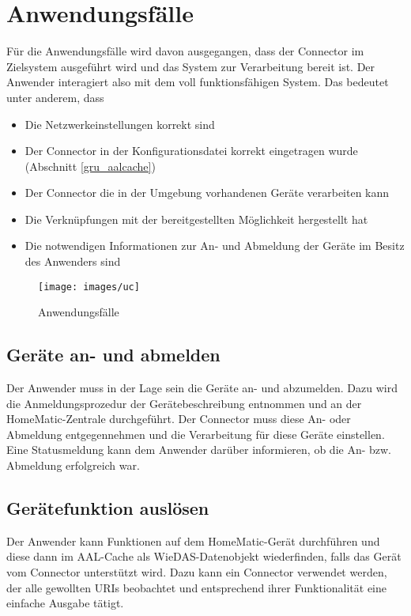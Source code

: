 \section{Anwendungsfälle}
\label{ana_uc}

Für die Anwendungsfälle wird davon ausgegangen, dass der Connector im Zielsystem ausgeführt wird
und das System zur Verarbeitung bereit ist.
Der Anwender interagiert also mit dem voll funktionsfähigen System.
Das bedeutet unter anderem, dass
\begin{itemize}
\item Die Netzwerkeinstellungen korrekt sind
\item Der Connector in der Konfigurationsdatei korrekt eingetragen wurde (Abschnitt \ref{gru_aalcache})
\item Der Connector die in der Umgebung vorhandenen Geräte verarbeiten kann
\item Die Verknüpfungen mit der bereitgestellten Möglichkeit hergestellt hat
\item Die notwendigen Informationen zur An- und Abmeldung der Geräte im Besitz des Anwenders sind
\end{itemize}

\begin{figure}[h]
\texttt{[image: images/uc]}
\caption{Anwendungsfälle}
\label{abb_uc}
\end{figure}

\subsection{Geräte an- und abmelden}
Der Anwender muss in der Lage sein die Geräte an- und abzumelden.
Dazu wird die Anmeldungsprozedur der Gerätebeschreibung entnommen und an der HomeMatic-Zentrale
durchgeführt.
Der Connector muss diese An- oder Abmeldung entgegennehmen und die Verarbeitung für diese
Geräte einstellen.
Eine Statusmeldung kann dem Anwender darüber informieren, ob die An- bzw. Abmeldung erfolgreich
war.

\subsection{Gerätefunktion auslösen}
Der Anwender kann Funktionen auf dem HomeMatic-Gerät durchführen und diese dann
im AAL-Cache als WieDAS-Datenobjekt wiederfinden, falls das Gerät vom Connector
unterstützt wird.
Dazu kann ein Connector verwendet werden, der alle gewollten URIs beobachtet und
entsprechend ihrer Funktionalität eine einfache Ausgabe tätigt.

